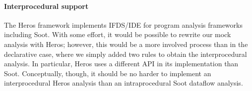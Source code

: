 






\paragraph{Interprocedural support} The Heros framework\cite{bodden12:_inter_proced_data_flow_analy} implements IFDS/IDE for program analysis frameworks including Soot. With some effort, it would be possible to rewrite our mock analysis with Heros; however, this would be a more involved process than in the declarative case, where we simply added two rules to obtain the interprocedural analysis. In particular, Heros uses a different API in its implementation than Soot. Conceptually, though, it should be no harder to implement an interprocedural Heros analysis than an intraprocedural Soot dataflow analysis. 


